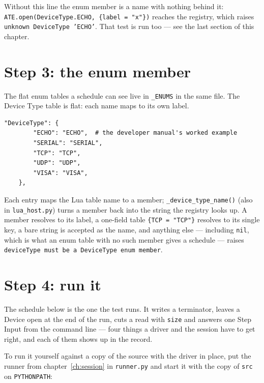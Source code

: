 Without this line the enum member is a name with nothing behind it: \texttt{ATE.open(DeviceType.ECHO,
\{label = "x"\})} reaches the registry, which raises \texttt{unknown DeviceType 'ECHO'}. That test is
run too --- see the last section of this chapter.

\section{Step 3: the enum member}

The flat enum tables a schedule can see live in \texttt{\_ENUMS} in the same file. The Device Type
table is flat: each name maps to its own label.

\begin{lstlisting}[language=ATEPython]
    "DeviceType": {
        "ECHO": "ECHO",  # the developer manual's worked example
        "SERIAL": "SERIAL",
        "TCP": "TCP",
        "UDP": "UDP",
        "VISA": "VISA",
    },
\end{lstlisting}

Each entry maps the Lua table name to a member; \texttt{\_device\_type\_name()} (also in
\texttt{lua\_\allowbreak host.py}) turns a member back into the string the registry looks up. A member
resolves to its label, a one-field table \texttt{\{TCP = "TCP"\}} resolves to its single key, a bare
string is accepted as the name, and anything else --- including \texttt{nil}, which is what an enum
table with no such member gives a schedule --- raises \texttt{deviceType must be a DeviceType enum
member}.

\section{Step 4: run it}

The schedule below is the one the test runs. It writes a terminator, leaves a Device open at the end
of the run, cuts a read with \texttt{size} and answers one Step Input from the command line --- four
things a driver and the session have to get right, and each of them shows up in the record.



To run it yourself against a copy of the source with the driver in place, put the runner from
chapter~\ref{ch:session} in \texttt{runner.py} and start it with the copy of \texttt{src} on
\texttt{PYTHONPATH}:


